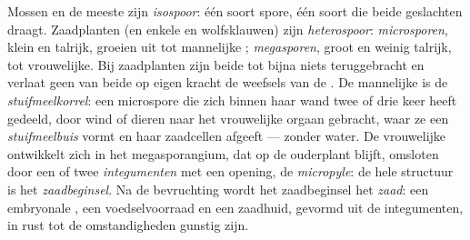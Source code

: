 \begin{definition}\label{def:b2:plant-life-cycles:heterospory}
Mossen en de meeste  zijn \emph{isospoor}: één soort spore, één
soort  die beide geslachten draagt. Zaadplanten (en enkele
 en wolfsklauwen) zijn \emph{heterospoor}: \emph{microsporen},
klein en talrijk, groeien uit tot mannelijke ;
\emph{megasporen}, groot en weinig talrijk, tot vrouwelijke. Bij
zaadplanten zijn beide tot bijna niets teruggebracht en verlaat geen van
beide op eigen kracht de weefsels van de . De mannelijke
 is de \emph{stuifmeelkorrel}: een microspore die zich binnen
haar wand twee of drie keer heeft gedeeld, door wind of dieren naar het
vrouwelijke orgaan gebracht, waar ze een \emph{stuifmeelbuis} vormt en
haar zaadcellen afgeeft --- zonder water. De vrouwelijke 
ontwikkelt zich in het megasporangium, dat op de ouderplant blijft,
omsloten door een of twee \emph{integumenten} met een opening, de
\emph{micropyle}: de hele structuur is het \emph{zaadbeginsel}. Na de
bevruchting wordt het zaadbeginsel het \emph{zaad}: een embryonale
, een voedselvoorraad en een zaadhuid, gevormd uit de
integumenten, in rust tot de omstandigheden gunstig zijn.
\end{definition}

